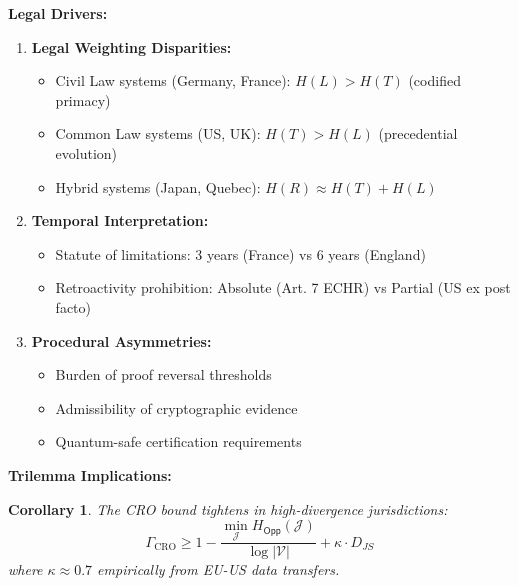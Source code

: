 \documentclass[preprint,12pt]{elsarticle}
\newtheorem{corollary}{Corollary}[section]
\begin{document}
            \textbf{Legal Drivers:}
            \begin{enumerate}
                \item \textbf{Legal Weighting Disparities:}
                \begin{itemize}
                    \item Civil Law systems (Germany, France): $H(L) > H(T)$ (codified primacy)
                    \item Common Law systems (US, UK): $H(T) > H(L)$ (precedential evolution)
                    \item Hybrid systems (Japan, Quebec): $H(R) \approx H(T) + H(L)$
                \end{itemize}
                
                \item \textbf{Temporal Interpretation:}
                \begin{itemize}
                    \item Statute of limitations: 3 years (France) vs 6 years (England)
                    \item Retroactivity prohibition: Absolute (Art. 7 ECHR) vs Partial (US ex post facto)
                \end{itemize}
                
                \item \textbf{Procedural Asymmetries:}
                \begin{itemize}
                    \item Burden of proof reversal thresholds
                    \item Admissibility of cryptographic evidence
                    \item Quantum-safe certification requirements
                \end{itemize}
            \end{enumerate}

            \textbf{Trilemma Implications:}
            \begin{corollary}\label{cor:jurisdictional_trilemma}
                The CRO bound tightens in high-divergence jurisdictions:
                \begin{equation}\label{eq:jurisdictional_trilemma}
                    \Gamma_{\text{CRO}} \geq 1 - \frac{\min_{\mathcal{J}} H_{\mathsf{Opp}}(\mathcal{J})}{\log|\mathcal{V}|} + \kappa \cdot D_{JS}
                \end{equation}
                where $\kappa \approx 0.7$ empirically from EU-US data transfers.
            \end{corollary}
\end{document}
